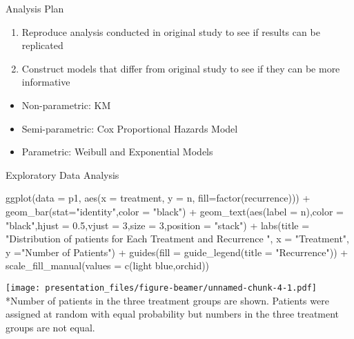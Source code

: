 \documentclass[
  ignorenonframetext,
]{beamer}
\newenvironment{Shaded}{\begin{snugshade}}{\end{snugshade}}
\newcommand{\AttributeTok}[1]{\textcolor[rgb]{0.77,0.63,0.00}{#1}}
\newcommand{\DecValTok}[1]{\textcolor[rgb]{0.00,0.00,0.81}{#1}}
\newcommand{\FloatTok}[1]{\textcolor[rgb]{0.00,0.00,0.81}{#1}}
\newcommand{\FunctionTok}[1]{\textcolor[rgb]{0.00,0.00,0.00}{#1}}
\newcommand{\NormalTok}[1]{#1}
\newcommand{\SpecialCharTok}[1]{\textcolor[rgb]{0.00,0.00,0.00}{#1}}
\newcommand{\StringTok}[1]{\textcolor[rgb]{0.31,0.60,0.02}{#1}}
\providecommand{\tightlist}{%
  \setlength{\itemsep}{0pt}\setlength{\parskip}{0pt}}
\begin{document}
\begin{frame}{Analysis Plan}
\protect\hypertarget{analysis-plan}{}
\begin{enumerate}
\tightlist
\item
  Reproduce analysis conducted in original study to see if results can
  be replicated
\item
  Construct models that differ from original study to see if they can be
  more informative
\end{enumerate}

\begin{itemize}
\tightlist
\item
  Non-parametric: KM
\item
  Semi-parametric: Cox Proportional Hazards Model
\item
  Parametric: Weibull and Exponential Models
\end{itemize}
\end{frame}

\begin{frame}[fragile]{Exploratory Data Analysis}
\protect\hypertarget{exploratory-data-analysis}{}
\begin{Shaded}
\begin{Highlighting}[]
\FunctionTok{ggplot}\NormalTok{(}\AttributeTok{data =}\NormalTok{ p1, }\FunctionTok{aes}\NormalTok{(}\AttributeTok{x =}\NormalTok{ treatment, }\AttributeTok{y =}\NormalTok{ n, }\AttributeTok{fill=}\FunctionTok{factor}\NormalTok{(recurrence))) }\SpecialCharTok{+} \FunctionTok{geom\_bar}\NormalTok{(}\AttributeTok{stat=}\StringTok{"identity"}\NormalTok{,}\AttributeTok{color =} \StringTok{"black"}\NormalTok{) }\SpecialCharTok{+} \FunctionTok{geom\_text}\NormalTok{(}\FunctionTok{aes}\NormalTok{(}\AttributeTok{label =}\NormalTok{ n),}\AttributeTok{color =} \StringTok{"black"}\NormalTok{,}\AttributeTok{hjust =} \FloatTok{0.5}\NormalTok{,}\AttributeTok{vjust =} \DecValTok{3}\NormalTok{,}\AttributeTok{size =} \DecValTok{3}\NormalTok{,}\AttributeTok{position =} \StringTok{"stack"}\NormalTok{) }\SpecialCharTok{+} \FunctionTok{labs}\NormalTok{(}\AttributeTok{title =} \StringTok{"Distribution of patients for Each Treatment and Recurrence "}\NormalTok{, }\AttributeTok{x =} \StringTok{"Treatment"}\NormalTok{, }\AttributeTok{y =}\StringTok{"Number of Patients"}\NormalTok{) }\SpecialCharTok{+} \FunctionTok{guides}\NormalTok{(}\AttributeTok{fill =} \FunctionTok{guide\_legend}\NormalTok{(}\AttributeTok{title =} \StringTok{"Recurrence"}\NormalTok{)) }\SpecialCharTok{+} \FunctionTok{scale\_fill\_manual}\NormalTok{(}\AttributeTok{values =} \FunctionTok{c}\NormalTok{(}\StringTok{\textquotesingle{}light blue\textquotesingle{}}\NormalTok{,}\StringTok{\textquotesingle{}orchid\textquotesingle{}}\NormalTok{))}
\end{Highlighting}
\end{Shaded}

\texttt{[image: presentation\_files/figure-beamer/unnamed-chunk-4-1.pdf]}
*Number of patients in the three treatment groups are shown. Patients
were assigned at random with equal probability but numbers in the three
treatment groups are not equal.
\end{frame}
\end{document}
